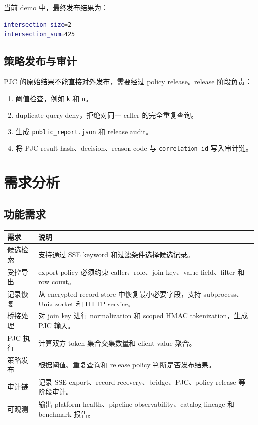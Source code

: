\documentclass[UTF8,a4paper,12pt,oneside]{ctexrep}
\begin{document}
当前 demo 中，最终发布结果为：

\begin{lstlisting}[language=bash]
intersection_size=2
intersection_sum=425
\end{lstlisting}

\section{策略发布与审计}

PJC 的原始结果不能直接对外发布，需要经过 policy release。release 阶段负责：

\begin{enumerate}
  \item 阈值检查，例如 \texttt{k} 和 \texttt{n}。
  \item duplicate-query deny，拒绝对同一 caller 的完全重复查询。
  \item 生成 \texttt{public\_report.json} 和 release audit。
  \item 将 PJC result hash、decision、reason code 与 \texttt{correlation\_id} 写入审计链。
\end{enumerate}

\chapter{需求分析}

\section{功能需求}

\begin{longtable}{p{}p{}}
\toprule
\textbf{需求} & \textbf{说明} \\
\midrule
候选检索 & 支持通过 SSE keyword 和过滤条件选择候选记录。 \\
受控导出 & export policy 必须约束 caller、role、join key、value field、filter 和 row count。 \\
记录恢复 & 从 encrypted record store 中恢复最小必要字段，支持 subprocess、Unix socket 和 HTTP service。 \\
桥接处理 & 对 join key 进行 normalization 和 scoped HMAC tokenization，生成 PJC 输入。 \\
PJC 执行 & 计算双方 token 集合交集数量和 client value 聚合。 \\
策略发布 & 根据阈值、重复查询和 release policy 判断是否发布结果。 \\
审计链 & 记录 SSE export、record recovery、bridge、PJC、policy release 等阶段审计。 \\
可观测 & 输出 platform health、pipeline observability、catalog lineage 和 benchmark 报告。 \\
\bottomrule
\end{longtable}
\end{document}
